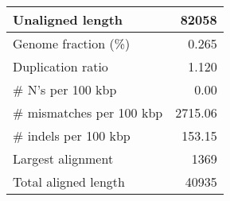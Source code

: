 \documentclass[12pt,a4paper]{article}
\begin{document}
\begin{table}[ht]
\begin{center}
\begin{tabular}{|l*{1}{|r}|}
Unaligned length & 82058 \\ \hline
Genome fraction (\%) & 0.265 \\ \hline
Duplication ratio & 1.120 \\ \hline
\# N's per 100 kbp & 0.00 \\ \hline
\# mismatches per 100 kbp & 2715.06 \\ \hline
\# indels per 100 kbp & 153.15 \\ \hline
Largest alignment & 1369 \\ \hline
Total aligned length & 40935 \\ \hline
\end{tabular}
\end{center}
\end{table}
\end{document}
